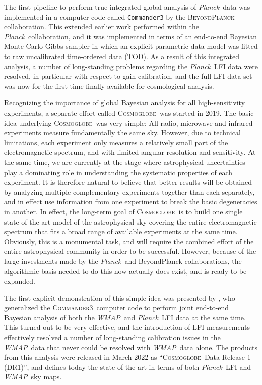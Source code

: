 \documentclass{aa}
\def\Cosmoglobe{\textsc{Cosmoglobe}}
\def\commanderthree{\textsc{Commander3}}
\def\Planck{\textit{Planck}}
\def\WMAP{\textit{WMAP}}
\begin{document}
The first pipeline to perform true integrated global analysis of \Planck\ data was implemented in a computer code called \texttt{Commander3} by the \textsc{BeyondPlanck} collaboration. This extended earlier work performed within the \Planck\ collaboration, and it was implemented in terms of an end-to-end Bayesian Monte Carlo Gibbs sampler in which an explicit parametric data model was fitted to raw uncalibrated time-ordered data (TOD). As a result of this integrated analysis, a number of long-standing problems regarding the \Planck\ LFI data were resolved, in particular with respect to gain calibration, and the full LFI data set was now for the first time finally available for cosmological analysis.

Recognizing the importance of global Bayesian analysis for all high-sensitivity experiments, a separate effort called \Cosmoglobe\ was started in 2019. The basic idea underlying \Cosmoglobe\ was very simple: All radio, microwave and infrared experiments measure fundamentally the same sky. However, due to technical limitations, each experiment only measures a relatively small part of the electromagnetic spectrum, and with limited angular resolution and sensitivity. At the same time, we are currently at the stage where astrophysical uncertainties play a dominating role in understanding the systematic properties of each experiment. It is therefore natural to believe that better results will be obtained by analyzing multiple complementary experiments together than each separately, and in effect use information from one experiment to break the basic degeneracies in another. In effect, the long-term goal of \Cosmoglobe\ is to build one single state-of-the-art model of the astrophysical sky covering the entire electromagnetic spectrum that fits a broad range of available experiments at the same time. Obviously, this is a monumental task, and will require the combined effort of the entire astrophysical community in order to be successful. However, because of the large investments made by the \Planck\ and BeyondPlanck collaborations, the algorithmic basis needed to do this now actually does exist, and is ready to be expanded.

The first explicit demonstration of this simple idea was presented by \citet{watts2023_dr1}, who generalized the \commanderthree\ computer code to perform joint end-to-end Bayesian analysis of both the \WMAP\ and \Planck\ LFI data at the same time. This turned out to be very effective, and the introduction of LFI measurements effectively resolved a number of long-standing calibration issues in the \WMAP\ data that never could be resolved with \WMAP\ data alone. The products from this analysis were released in March 2022 as ``\Cosmoglobe\ Data Release 1 (DR1)'', and defines today the state-of-the-art in terms of both \Planck\ LFI and \WMAP\ sky maps.
\end{document}
